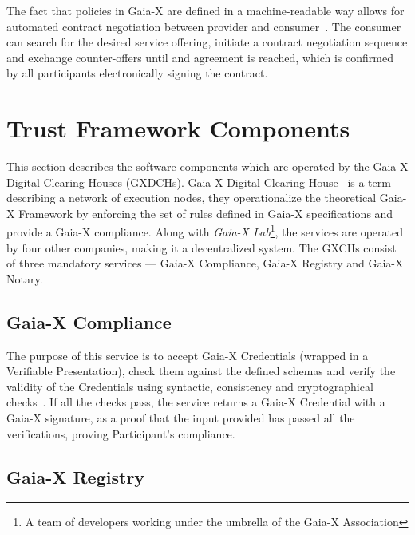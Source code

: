 The fact that policies in Gaia-X are defined in a machine-readable way allows for automated contract negotiation between provider and consumer~\cite{gaiax_data_exchange_document}.
The consumer can search for the desired service offering, initiate a contract negotiation sequence and exchange counter-offers until and agreement is reached, which is confirmed by all participants electronically signing the contract.

\section{Trust Framework Components}\label{sec:trust-framework-components}

This section describes the software components which are operated by the Gaia-X Digital Clearing Houses (GXDCHs).
Gaia-X Digital Clearing House~\cite{gaiax} is a term describing a network of execution nodes, they operationalize the theoretical Gaia-X Framework by enforcing the set of rules defined in Gaia-X specifications and provide a Gaia-X compliance.
Along with \textit{Gaia-X Lab}\footnote{A team of developers working under the umbrella of the Gaia-X Association}, the services are operated by four other companies, making it a decentralized system.
The GXCHs consist of three mandatory services --- Gaia-X Compliance, Gaia-X Registry and Gaia-X Notary.

\subsection{Gaia-X Compliance}\label{subsec:gaia-x-compliance}

The purpose of this service is to accept Gaia-X Credentials (wrapped in a Verifiable Presentation), check them against the defined schemas and verify the validity of the Credentials using syntactic, consistency and cryptographical checks~\cite{gaiax_trust_framework}.
If all the checks pass, the service returns a Gaia-X Credential with a Gaia-X signature, as a proof that the input provided has passed all the verifications, proving Participant's compliance.

\subsection{Gaia-X Registry}\label{subsec:gaia-x-registry}


